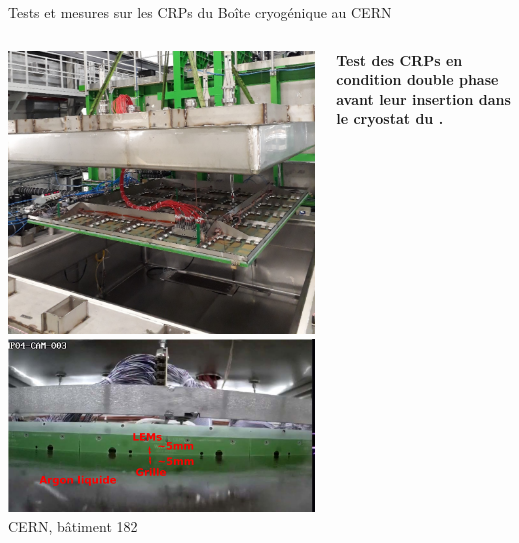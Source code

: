 {
	\setlength\pdfpagewidth{12.8cm}%
	\setlength\pdfpageheight{9cm}%
	\begin{frame}[plain]
	\end{frame}
}

    \begin{frame}{Tests et mesures sur les CRPs du \SSS{}}{Boîte cryogénique au CERN}
   		\begin{columns}
   			\begin{column}{0.4\textwidth}
   				\includegraphics[width=\textwidth]{./pictures/crp_inserting_coldbox.png}\\
   				\includegraphics[width=\textwidth]{./pictures/in_coldbox.png}\\
   				CERN, bâtiment 182
    		\end{column}
    		\begin{column}{0.6\textwidth}
    			\begin{scriptsize}
	    			\textbf{Test des CRPs en condition double phase avant leur insertion dans le cryostat du \SSS{}.}\\
	    			

\end{scriptsize}
\end{column}
\end{columns}
\end{frame}
